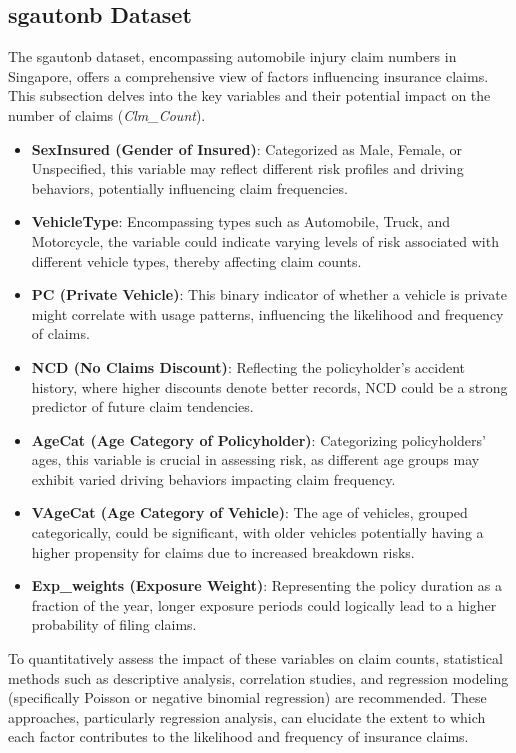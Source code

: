 \newpage

\subsection{sgautonb Dataset}
The sgautonb dataset, encompassing automobile injury claim numbers in Singapore, offers a comprehensive view of factors influencing insurance claims. This subsection delves into the key variables and their potential impact on the number of claims (\textit{Clm\_Count}).

\begin{itemize}
    \item \textbf{SexInsured (Gender of Insured)}: Categorized as Male, Female, or Unspecified, this variable may reflect different risk profiles and driving behaviors, potentially influencing claim frequencies.
    
    \item \textbf{VehicleType}: Encompassing types such as Automobile, Truck, and Motorcycle, the variable could indicate varying levels of risk associated with different vehicle types, thereby affecting claim counts.
    
    \item \textbf{PC (Private Vehicle)}: This binary indicator of whether a vehicle is private might correlate with usage patterns, influencing the likelihood and frequency of claims.
    
    \item \textbf{NCD (No Claims Discount)}: Reflecting the policyholder's accident history, where higher discounts denote better records, NCD could be a strong predictor of future claim tendencies.
    
    \item \textbf{AgeCat (Age Category of Policyholder)}: Categorizing policyholders' ages, this variable is crucial in assessing risk, as different age groups may exhibit varied driving behaviors impacting claim frequency.
    
    \item \textbf{VAgeCat (Age Category of Vehicle)}: The age of vehicles, grouped categorically, could be significant, with older vehicles potentially having a higher propensity for claims due to increased breakdown risks.
    
    \item \textbf{Exp\_weights (Exposure Weight)}: Representing the policy duration as a fraction of the year, longer exposure periods could logically lead to a higher probability of filing claims.
\end{itemize}

To quantitatively assess the impact of these variables on claim counts, statistical methods such as descriptive analysis, correlation studies, and regression modeling (specifically Poisson or negative binomial regression) are recommended. These approaches, particularly regression analysis, can elucidate the extent to which each factor contributes to the likelihood and frequency of insurance claims. 
